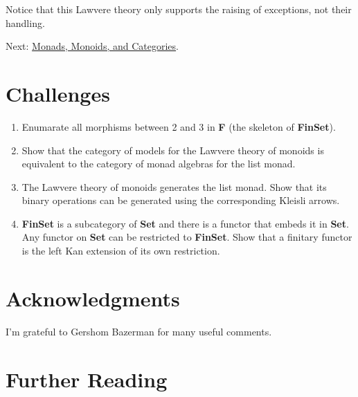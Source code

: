 Notice that this Lawvere theory only supports the raising of exceptions,
not their handling.

Next:
\href{https://bartoszmilewski.com/2017/09/06/monads-monoids-and-categories/}{Monads,
Monoids, and Categories}.

\section{Challenges}\label{challenges}

\begin{enumerate}
\tightlist
\item
  Enumarate all morphisms between 2 and 3 in \textbf{F} (the skeleton of
  \textbf{FinSet}).
\item
  Show that the category of models for the Lawvere theory of monoids is
  equivalent to the category of monad algebras for the list monad.
\item
  The Lawvere theory of monoids generates the list monad. Show that its
  binary operations can be generated using the corresponding Kleisli
  arrows.
\item
  \textbf{FinSet} is a subcategory of \textbf{Set} and there is a
  functor that embeds it in \textbf{Set}. Any functor on \textbf{Set}
  can be restricted to \textbf{FinSet}. Show that a finitary functor is
  the left Kan extension of its own restriction.
\end{enumerate}

\section{Acknowledgments}\label{acknowledgments}

I'm grateful to Gershom Bazerman for many useful comments.

\section{Further Reading}\label{further-reading}

